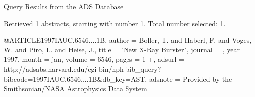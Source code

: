 Query Results from the ADS Database


Retrieved 1 abstracts, starting with number 1.  Total number selected: 1.

@ARTICLE{1997IAUC.6546....1B,
   author = {{Boller}, T. and {Haberl}, F. and {Voges}, W. and {Piro}, L. and 
	{Heise}, J.},
    title = "{New X-Ray Burster}",
  journal = {\iaucirc},
     year = 1997,
    month = jan,
   volume = 6546,
    pages = {1-+},
   adsurl = {http://adsabs.harvard.edu/cgi-bin/nph-bib_query?bibcode=1997IAUC.6546....1B&db_key=AST},
  adsnote = {Provided by the Smithsonian/NASA Astrophysics Data System}
}


